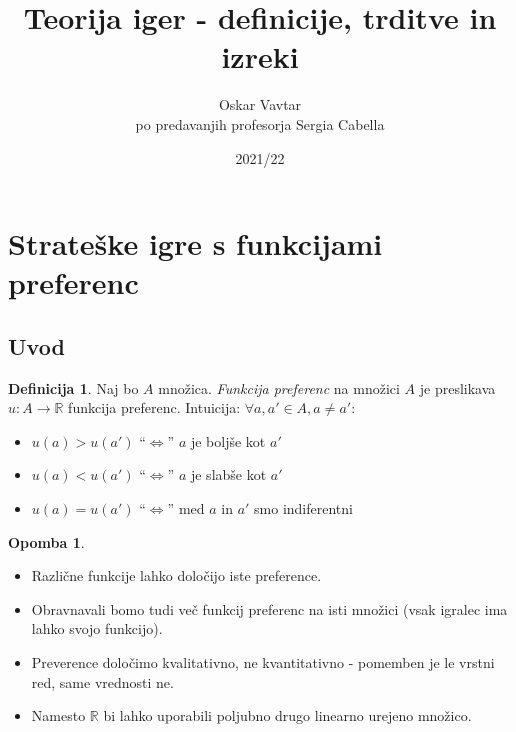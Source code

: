 \documentclass[11pt]{article}
\title{Teorija iger - definicije, trditve in izreki}
\author{Oskar Vavtar \\
po predavanjih profesorja Sergia Cabella}
\date{2021/22}
\newcommand{\R}{\mathbb{R}}
\theoremstyle{definition}
\newtheorem{definicija}{Definicija}[section]
\theoremstyle{definition}
\theoremstyle{definition}
\theoremstyle{definition}
\newtheorem*{opomba}{Opomba}
\begin{document}
\maketitle
\pagebreak
\tableofcontents
\pagebreak


\section{Strateške igre s funkcijami preferenc}
\vspace{0.5cm}


\subsection{Uvod}
\vspace{0.5cm}

\begin{definicija}

Naj bo $A$ množica. \textit{Funkcija preferenc} na množici $A$ je preslikava $u: A \rightarrow \R$ funkcija preferenc. Intuicija: $\forall a,a' \in A, a \neq a'$:
\begin{itemize}
	\item $u(a)>u(a')$ ``$\iff$'' $a$ je boljše kot $a'$
	\item $u(a)<u(a')$ ``$\iff$'' $a$ je slabše kot $a'$
	\item $u(a)=u(a')$ ``$\iff$'' med $a$ in $a'$ smo indiferentni
\end{itemize}

\end{definicija}
\vspace{0.5cm}

\begin{opomba}
~
\begin{itemize}
	\item Različne funkcije lahko določijo iste preference.
	\item Obravnavali bomo tudi več funkcij preferenc na isti množici (vsak igralec ima lahko svojo funkcijo).
	\item Preverence določimo kvalitativno, ne kvantitativno - pomemben je le vrstni red, same vrednosti ne.
	\item Namesto $\R$ bi lahko uporabili poljubno drugo linearno urejeno množico.
\end{itemize}

\end{opomba} 
\vspace{0.5cm}
\end{document}

